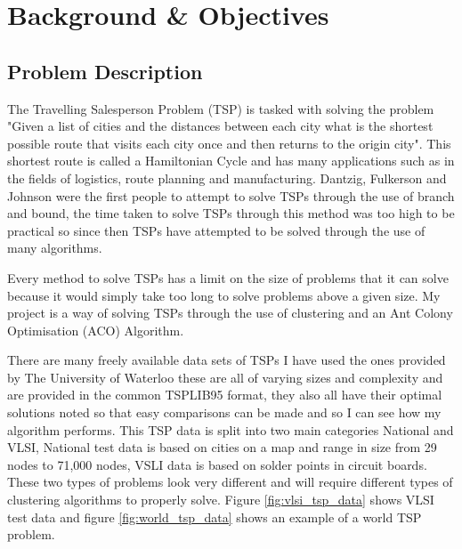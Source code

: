 \chapter{Background \& Objectives}

\section{Problem Description}

The Travelling Salesperson Problem (TSP) is tasked with solving the problem "Given a list of cities and the distances between each city what is the shortest possible route that visits each city once and then returns to the origin city". This shortest route is called a Hamiltonian Cycle and has many applications such as in the fields of logistics, route planning and manufacturing\cite{acobook}. Dantzig, Fulkerson and Johnson were the first people to attempt to solve TSPs through the use of branch and bound\cite{dantzig1954solution}, the time taken to solve TSPs through this method was too high to be practical so since then TSPs have attempted to be solved through the use of many algorithms.

Every method to solve TSPs has a limit on the size of problems that it can solve because it would simply take too long to solve problems above a given size. My project is a way of solving TSPs through the use of clustering and an Ant Colony Optimisation (ACO) Algorithm.

There are many freely available data sets of TSPs I have used the ones provided by The University of Waterloo\cite{tsp_test_data_2009} these are all of varying sizes and complexity and are provided in the common TSPLIB95 format, they also all have their optimal solutions noted so that easy comparisons can be made and so I can see how my algorithm performs. This TSP data is split into two main categories National and VLSI, National test data is based on cities on a map and range in size from 29 nodes to 71,000 nodes, VSLI data is based on solder points in circuit boards. These two types of problems look very different and will require different types of clustering algorithms to properly solve. Figure \ref{fig:vlsi_tsp_data} shows VLSI test data and figure \ref{fig:world_tsp_data} shows an example of a world TSP problem.

